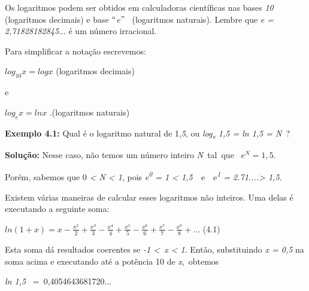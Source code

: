 \documentclass[12pt]{article}
\begin{document}
\begin{enumerate}[label*={\fontsize{14pt}{14pt}\selectfont \textbf{\arabic*.}}]
\begin{enumerate}
\vspace{\baselineskip}
\begin{justify}
Os logaritmos podem ser obtidos em calculadoras científicas nas bases \textit{10} (logaritmos decimais) e  base $``$\textit{e}$"$ \  (logaritmos naturais). Lembre que \textit{e = 2,71828182845}... é um número irracional.
\end{justify}\par

Para simplificar a notação escrevemos:\par

\begin{Center}
 \( log_{10}x=logx \)  \tab (logaritmos decimais)
\end{Center}\par

e\par

\begin{Center}
 \( log_{e}x=lnx \) .\tab \tab (logaritmos naturais)
\end{Center}\par


\vspace{\baselineskip}
\textbf{Exemplo 4.1: }Qual é o logaritmo natural de 1,\textit{5}, ou \textit{log\textsubscript{e} 1,5 = ln 1,5 = N\  }? \par

\textbf{Solução:} Nesse caso, não temos um número inteiro \textit{N}\  tal\ que  \   \(  e^{N}=1,5. \) \par

Porém, sabemos que 0\textit{ < N < 1}, pois \textit{e\textsuperscript{0} = 1 < 1,5\ \  }e\ \  e\textit{\textsuperscript{1} = 2.71....> 1,5.}\ \  \par

Existem várias maneiras de calcular esses logaritmos não inteiros. Uma delas é executando a seguinte soma:\par

 \( ln \left( 1+x \right) =x-\frac{x^{2}}{2} +\frac{x^{3}}{3} -\frac{x^{4}}{4} +\frac{x^{5}}{5} -\frac{x^{6}}{6} + \frac{x^{7}}{7}-\frac{x^{8}}{8}+ \ldots  \) \tab \tab (4.1)\par

Esta soma dá resultados coerentes se \textit{-1 <\  x < 1}. Então, substituindo \textit{x = 0,5 }na soma acima e executando até a potência 10 de \textit{x},\ obtemos  \par

\textit{ln 1,5 }\ =\   0,4054643681720...\par


\end{enumerate}
\end{enumerate}
\end{document}
